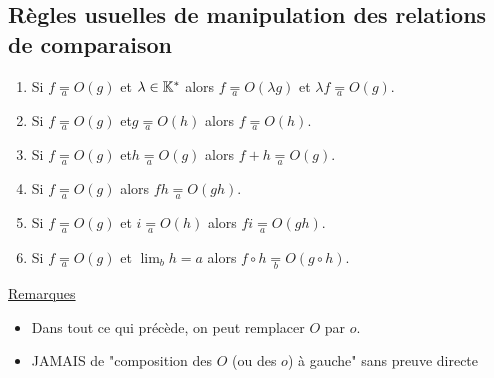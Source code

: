 \subsection{Règles usuelles de manipulation des relations de comparaison}

\begin{defprop}
    \begin{enumerate}
    \item Si \(f \underset{a}{=} O(g)\) et \(\lambda  \in  \mathbb{K}^*\) alors \(f \underset{a}{=}  O(\lambda  g)\) et \(\lambda f \underset{a}{=} O(g)\).
    \item Si \(f \underset{a}{=} O(g)\) et\( g \underset{a}{=} O(h)\) alors \(f \underset{a}{=} O(h)\).
    \item Si \(f \underset{a}{=} O(g)\) et\( h \underset{a}{=} O(g)\) alors \(f + h \underset{a}{=} O(g)\).
    \item Si \(f \underset{a}{=} O(g)\) alors \(f h \underset{a}{=} O(gh)\).
    \item Si \(f \underset{a}{=} O(g)\) et \(i \underset{a}{=} O(h)\) alors \(f i \underset{a}{=} O(gh)\).
    \item Si \(f \underset{a}{=} O(g)\) et \(\lim_{b} h = a\) alors \(f \circ h \underset{b}{=} O(g \circ h)\).
    \end{enumerate}
\underline{Remarques}
    \begin{itemize}
        \item Dans tout ce qui précède, on peut remplacer \(O\) par \(o\).
        \item JAMAIS de "composition des \(O\) (ou des \(o\)) à gauche" sans preuve directe
    \end{itemize}
\end{defprop}

